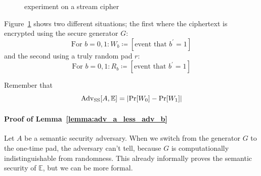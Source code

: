 \documentclass[10pt,a4paper]{report}
\begin{document}
\begin{figure}[H]
    \centering
    \caption{experiment on a stream cipher}
    \label{fig:stream_cipher_experiment}
\end{figure}

Figure~\ref{fig:stream_cipher_experiment} shows two different situations; the first where the
ciphertext is encrypted using the secure generator $G$:
    $$ \text{For } b = 0, 1 \colon W_b \coloneqq [\text{event that } b^\prime = 1] $$
and the second using a truly random pad $r$:
    $$ \text{For } b = 0, 1 \colon R_b \coloneqq [\text{event that } b^\prime = 1] $$

Remember that
    $$ \operatorname{Adv_{SS}}[A, \mathbb{E}] = \abs{\operatorname{Pr}[W_0] -
       \operatorname{Pr}[W_1]} $$ 

\paragraph{Proof of Lemma~\ref{lemma:adv_a_less_adv_b}} Let $A$ be a semantic security adversary.
When we switch from the generator $G$ to the one-time pad, the adversary can't tell, because $G$ is
computationally indistinguishable from randomness. This already informally proves the semantic
security of $\mathbb{E}$, but we can be more formal.
\end{document}
